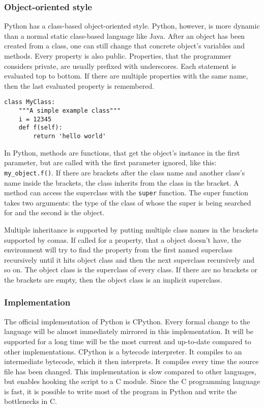 \subsubsection{Object-oriented style}
Python has a class-based object-oriented style. Python, however, is more dynamic than a normal static class-based language like Java. After an object has been created from a class, one can still change that concrete object's variables and methods. Every property is also public. Properties, that the programmer considers private, are usually prefixed with underscores. Each statement is evaluated top to bottom. If there are multiple properties with the same name, then the last evaluated property is remembered.
\begin{verbatim}
class MyClass:
    """A simple example class"""
    i = 12345
    def f(self):
        return 'hello world'
\end{verbatim}
In Python, methods are functions, that get the object's instance in the first parameter, but are called with the first parameter ignored, like this: \verb;my_object.f();. If there are brackets after the class name and another class's name inside the brackets, the class inherits from the class in the bracket. A method can access the superclass with the \verb;super; function. The super function takes two arguments: the type of the class of whose the super is being searched for and the second is the object.

Multiple inheritance is supported by putting multiple class names in the brackets supported by comas. If called for a property, that a object doesn't have, the environment will try to find the property from the first named superclass recursively until it hits object class and then the next superclass recursively and so on. The object class is the superclass of every class. If there are no brackets or the brackets are empty, then the object class is an implicit superclass.

\subsubsection{Implementation}

The official implementation of Python is CPython. Every formal change to the
language will be almost immediately mirrored in this implementation. It will be
supported for a long time will be the most current and up-to-date compared to
other implementations. CPython is a bytecode interpreter. It compiles to an
intermediate bytecode, which it then interprets. It compiles every time the
source file has been changed. This implementation is slow compared to
other languages\cite{website:python-speed}, but enables hooking the script to a
C module. Since the C programming language is fast,\cite{website:c-vs-python} it
is possible to write most of the program in Python and write the bottlenecks in
C.

